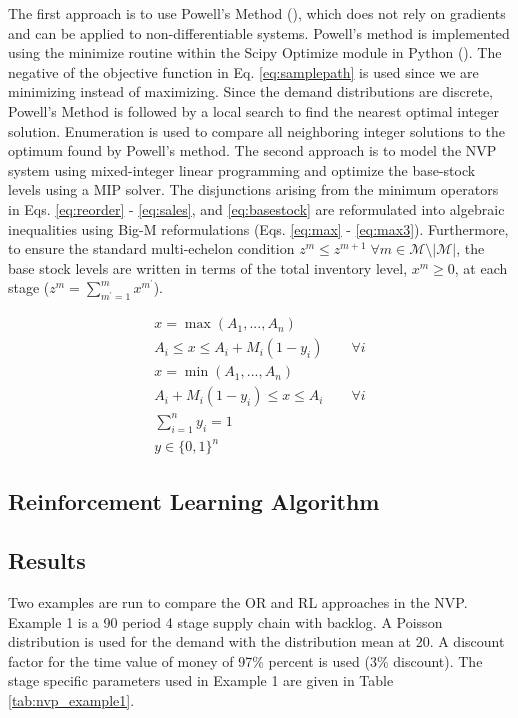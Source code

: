 \documentclass[12pt]{article}
\begin{document}
The first approach is to use Powell's Method (\cite{Powell1964AnDerivatives}), which does not rely on gradients and can be applied to non-differentiable systems. Powell's method is implemented using the minimize routine within the Scipy Optimize module in Python (\cite{Virtanen2020SciPyPython}). The negative of the objective function in Eq. \ref{eq:samplepath} is used since we are minimizing instead of maximizing. Since the demand distributions are discrete, Powell's Method is followed by a local search to find the nearest optimal integer solution. Enumeration is used to compare all neighboring integer solutions to the optimum found by Powell's method. The second approach is to model the NVP system using mixed-integer linear programming and optimize the base-stock levels using a MIP solver. The disjunctions arising from the minimum operators in Eqs. \ref{eq:reorder} - \ref{eq:sales}, and \ref{eq:basestock} are reformulated into algebraic inequalities using Big-M reformulations (Eqs. \ref{eq:max} - \ref{eq:max3}). Furthermore, to ensure the standard multi-echelon condition $z^m \leq z^{m+1} \; \forall m \in \mathcal{M} \setminus |\mathcal{M}|$, the base stock levels are written in terms of the total inventory level, $x^m \geq 0$, at each stage ($z^m = \sum_{m^\prime = 1}^m x^{m^\prime}$).

\begin{align}
    x = \max(A_1,...,A_n) \qquad \qquad \label{eq:max}\\
    A_i \leq x \leq A_i + M_i(1-y_i) \qquad \forall i \label{eq:max1} \\
    x = \min(A_1,...,A_n) \qquad \qquad \label{eq:min} \\
    A_i + M_i(1-y_i) \leq x \leq A_i \qquad \forall i \label{eq:min1} \\
    \sum_{i=1}^n y_i = 1 \qquad \qquad \qquad \label{eq:max2} \\
    y \in \{0,1\}^n \qquad \qquad \qquad \label{eq:max3}
\end{align}

\subsection{Reinforcement Learning Algorithm}

\subsection{Results}

Two examples are run to compare the OR and RL approaches in the NVP. Example 1 is a 90 period 4 stage supply chain with backlog. A Poisson distribution is used for the demand with the distribution mean at 20. A discount factor for the time value of money of 97\% percent is used (3\% discount). The stage specific parameters used in Example 1 are given in Table \ref{tab:nvp_example1}.
\end{document}
